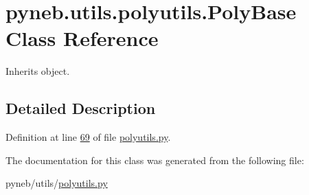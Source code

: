 \hypertarget{classpyneb_1_1utils_1_1polyutils_1_1_poly_base}{\section{pyneb.\-utils.\-polyutils.\-Poly\-Base Class Reference}
\label{classpyneb_1_1utils_1_1polyutils_1_1_poly_base}
}


Inherits object.



\subsection{Detailed Description}


Definition at line \hyperlink{polyutils_8py_source_l00069}{69} of file \hyperlink{polyutils_8py_source}{polyutils.\-py}.



The documentation for this class was generated from the following file\-:\begin{DoxyCompactItemize}
\item 
pyneb/utils/\hyperlink{polyutils_8py}{polyutils.\-py}\end{DoxyCompactItemize}

